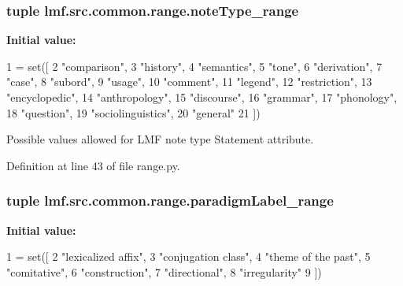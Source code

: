 \hypertarget{namespacelmf_1_1src_1_1common_1_1range_a042b6a6bbc9e29deed31854fb1767b88}{
\subsubsection[{note\+Type\+\_\+range}]{\setlength{\rightskip}{0pt plus 5cm}tuple lmf.\+src.\+common.\+range.\+note\+Type\+\_\+range}}\label{namespacelmf_1_1src_1_1common_1_1range_a042b6a6bbc9e29deed31854fb1767b88}
{\bfseries Initial value\+:}
\begin{DoxyCode}
1 = set([
2     \textcolor{stringliteral}{"comparison"},
3     \textcolor{stringliteral}{"history"},
4     \textcolor{stringliteral}{"semantics"},
5     \textcolor{stringliteral}{"tone"},
6     \textcolor{stringliteral}{"derivation"},
7     \textcolor{stringliteral}{"case"},
8     \textcolor{stringliteral}{"subord"},
9     \textcolor{stringliteral}{"usage"},
10     \textcolor{stringliteral}{"comment"},
11     \textcolor{stringliteral}{"legend"},
12     \textcolor{stringliteral}{"restriction"},
13     \textcolor{stringliteral}{"encyclopedic"},
14     \textcolor{stringliteral}{"anthropology"},
15     \textcolor{stringliteral}{"discourse"},
16     \textcolor{stringliteral}{"grammar"},
17     \textcolor{stringliteral}{"phonology"},
18     \textcolor{stringliteral}{"question"},
19     \textcolor{stringliteral}{"sociolinguistics"},
20     \textcolor{stringliteral}{"general"}
21 ])
\end{DoxyCode}


Possible values allowed for L\+M\+F note type Statement attribute. 



Definition at line 43 of file range.\+py.

\hypertarget{namespacelmf_1_1src_1_1common_1_1range_a9915518fc99ee54c5ac61a23dc12aefe}{
\subsubsection[{paradigm\+Label\+\_\+range}]{\setlength{\rightskip}{0pt plus 5cm}tuple lmf.\+src.\+common.\+range.\+paradigm\+Label\+\_\+range}}\label{namespacelmf_1_1src_1_1common_1_1range_a9915518fc99ee54c5ac61a23dc12aefe}
{\bfseries Initial value\+:}
\begin{DoxyCode}
1 = set([
2     \textcolor{stringliteral}{"lexicalized affix"},
3     \textcolor{stringliteral}{"conjugation class"},
4     \textcolor{stringliteral}{"theme of the past"},
5     \textcolor{stringliteral}{"comitative"},
6     \textcolor{stringliteral}{"construction"},
7     \textcolor{stringliteral}{"directional"},
8     \textcolor{stringliteral}{"irregularity"}
9 ])
\end{DoxyCode}


